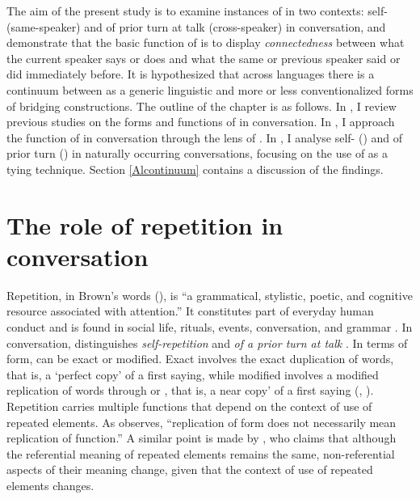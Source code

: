 \documentclass[output=paper]{LSP/langsci}
\begin{document}
The aim of the present study is to examine instances of  in two contexts: self- (same-speaker) and  of prior turn at talk (cross-speaker) in  conversation, and demonstrate that the basic function of  is to display \textit{connectedness} between what the current speaker says or does and what the same or previous speaker said or did immediately before. It is hypothesized that across languages there is a continuum between  as a generic linguistic  and more or less conventionalized forms of bridging constructions. The outline of the chapter is as follows. In , I review previous studies on the forms and functions of  in conversation. In , I approach the  function of  in conversation through the lens of . In , I analyse self- () and  of prior turn () in naturally occurring conversations, focusing on the use of  as a tying technique. Section \ref{Alcontinuum} contains a discussion of the findings. 

\section{The role of repetition in conversation}
\label{Alrole.repetition}
Repetition, in Brown's words (\citeyear[][225]{brown.2000}), is ``a grammatical, stylistic, poetic, and cognitive resource associated with attention.'' It constitutes part of everyday human conduct and is found in social life, rituals, events, conversation, and grammar \citep{johnstone94,brown.2000, wong10}. In conversation,  distinguishes \textit{self-repetition} and \textit{ of a prior turn at talk} \citep{brown.2000}. In terms of form,  can be exact or modified. Exact  involves the exact duplication of words, that is, a `perfect copy' of a first saying, while modified  involves a modified replication of words through  or , that is, a near copy' of a first saying (\citealt[][368]{couper96}, \citealt[][224]{brown.2000}). Repetition carries multiple functions that depend on the context of use of repeated elements. As \citet[][368]{couper96} observes, ``replication of form does not necessarily mean replication of function.'' A similar point is made by \citet[][12]{johnstone94}, who claims that although the referential meaning of repeated elements remains the same, non-referential aspects of their meaning change, given that the context of use of repeated elements changes. 
\end{document}

